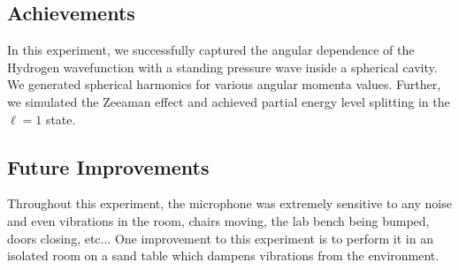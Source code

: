 \documentclass[12pt]{article}
\begin{document}
	\subsection{Achievements}
	In this experiment, we successfully captured the angular dependence of the Hydrogen wavefunction with a standing pressure wave inside a spherical cavity. We generated spherical harmonics for various angular momenta values. Further, we simulated the Zeeaman effect and achieved partial energy level splitting in the $\ell=1$ state. 

	\subsection{Future Improvements}
	Throughout this experiment, the microphone was extremely sensitive to any noise and even vibrations in the room, chairs moving, the lab bench being bumped, doors closing, etc... One improvement to this experiment is to perform it in an isolated room on a sand table which dampens vibrations from the environment.
	
%

\newpage

\nocite{*} %

\end{document}
